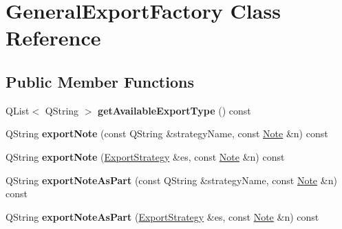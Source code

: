 \hypertarget{class_general_export_factory}{\section{General\-Export\-Factory Class Reference}
\label{class_general_export_factory}
}
\subsection*{Public Member Functions}
\begin{DoxyCompactItemize}
\item 
\hypertarget{class_general_export_factory_aa3ded2962777498a79d7aa17ec0197f7}{Q\-List$<$ Q\-String $>$ {\bfseries get\-Available\-Export\-Type} () const }\label{class_general_export_factory_aa3ded2962777498a79d7aa17ec0197f7}

\item 
\hypertarget{class_general_export_factory_a85663004a445fbb50acc69bdd0883215}{Q\-String {\bfseries export\-Note} (const Q\-String \&strategy\-Name, const \hyperlink{class_note}{Note} \&n) const }\label{class_general_export_factory_a85663004a445fbb50acc69bdd0883215}

\item 
\hypertarget{class_general_export_factory_ac85e886b00f965b4339d56384c16cf08}{Q\-String {\bfseries export\-Note} (\hyperlink{class_export_strategy}{Export\-Strategy} \&es, const \hyperlink{class_note}{Note} \&n) const }\label{class_general_export_factory_ac85e886b00f965b4339d56384c16cf08}

\item 
\hypertarget{class_general_export_factory_a523b972e3c61e6273749dc0b37589800}{Q\-String {\bfseries export\-Note\-As\-Part} (const Q\-String \&strategy\-Name, const \hyperlink{class_note}{Note} \&n) const }\label{class_general_export_factory_a523b972e3c61e6273749dc0b37589800}

\item 
\hypertarget{class_general_export_factory_a08d8aefa406b56477232d7ded158135b}{Q\-String {\bfseries export\-Note\-As\-Part} (\hyperlink{class_export_strategy}{Export\-Strategy} \&es, const \hyperlink{class_note}{Note} \&n) const }\label{class_general_export_factory_a08d8aefa406b56477232d7ded158135b}

\end{DoxyCompactItemize}

